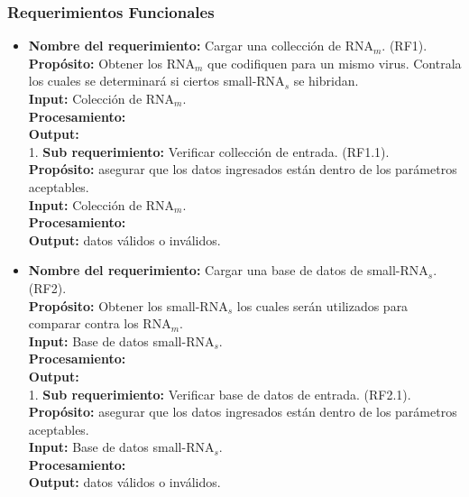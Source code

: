 \documentclass[12pt,a4paper,spanish]{article}
\begin{document}
	\subsubsection{Requerimientos Funcionales}
	\begin{itemize}
		\item \textbf{Nombre del requerimiento:} Cargar una collección de RNA$_m$. (RF1).\\
 	    \textbf{Propósito:} Obtener los RNA$_m$ que codifiquen para un mismo virus. Contrala los cuales se determinará si 								ciertos small-RNA$_s$ se hibridan.\\
		\textbf{Input:} Colección de RNA$_m$.\\
		\textbf{Procesamiento:} \\
		\textbf{Output:} \\

		1. \textbf{Sub requerimiento:} Verificar collección de entrada. (RF1.1).\\
 	    \textbf{Propósito:} asegurar que los datos ingresados están dentro de los parámetros aceptables. \\						
		\textbf{Input:} Colección de RNA$_m$.\\
		\textbf{Procesamiento:} \\
		\textbf{Output:} datos válidos o inválidos.\\

		\vskip 1cm
		\item \textbf{Nombre del requerimiento:} Cargar una base de datos de small-RNA$_s$. (RF2).\\
 	    \textbf{Propósito:} Obtener los small-RNA$_s$ los cuales serán utilizados para comparar contra los RNA$_m$.\\
		\textbf{Input:} Base de datos small-RNA$_s$.\\
		\textbf{Procesamiento:} \\
		\textbf{Output:} \\

		1. \textbf{Sub requerimiento:} Verificar base de datos de entrada. (RF2.1).\\
 	    \textbf{Propósito:} asegurar que los datos ingresados están dentro de los parámetros aceptables. \\
		\textbf{Input:} Base de datos small-RNA$_s$.\\
		\textbf{Procesamiento:} \\
		\textbf{Output:} datos válidos o inválidos.\\


\end{itemize}
\end{document}

